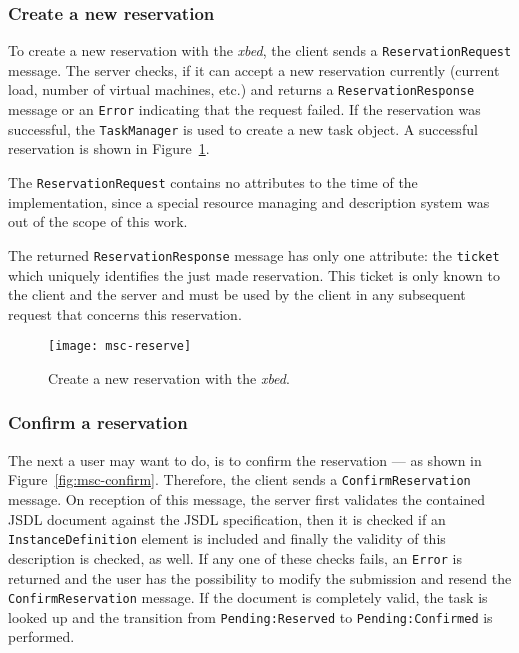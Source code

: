 \subsubsection{Create a new reservation}

To  create a  new reservation  with the  \emph{xbed}, the  client  sends a
\texttt{ReservationRequest} message.  The server  checks, if it can accept
a  new reservation currently  (current load,  number of  virtual machines,
etc.)    and  returns   a  \texttt{ReservationResponse}   message   or  an
\texttt{Error} indicating that the  request failed. If the reservation was
successful,  the  \texttt{TaskManager}  is  used  to  create  a  new  task
object. A successful reservation is shown in Figure~\ref{fig:msc-reserve}.

\bigskip

The \texttt{ReservationRequest} contains no  attributes to the time of the
implementation, since  a special resource managing  and description system
was  out  of  the  scope  of   this  work.

The returned \texttt{ReservationResponse}  message has only one attribute:
the   \texttt{ticket}   which    uniquely   identifies   the   just   made
reservation. This  ticket is only known  to the client and  the server and
must be  used by the client  in any subsequent request  that concerns this
reservation.

\begin{figure}[ht]
  \centering
  \texttt{[image: msc-reserve]}
  \caption[MSC Create  Reservation]{Create   a  new  reservation  with  the
    \emph{xbed}.}
  \label{fig:msc-reserve}
\end{figure}


\subsubsection{Confirm a reservation}

The next a user may want to do, is to confirm the reservation --- as shown
in   Figure~\ref{fig:msc-confirm}.    Therefore,   the  client   sends   a
\texttt{ConfirmReservation}  message. On  reception of  this  message, the
server  first  validates the  contained  JSDL  document  against the  JSDL
specification,  then  it  is  checked  if  an  \texttt{InstanceDefinition}
element  is included  and  finally  the validity  of  this description  is
checked, as well.  If any one  of these checks fails, an \texttt{Error} is
returned and  the user  has the possibility  to modify the  submission and
resend  the  \texttt{ConfirmReservation}  message.   If  the  document  is
completely  valid,  the  task  is   looked  up  and  the  transition  from
\texttt{Pending:Reserved} to \texttt{Pending:Confirmed} is performed.

